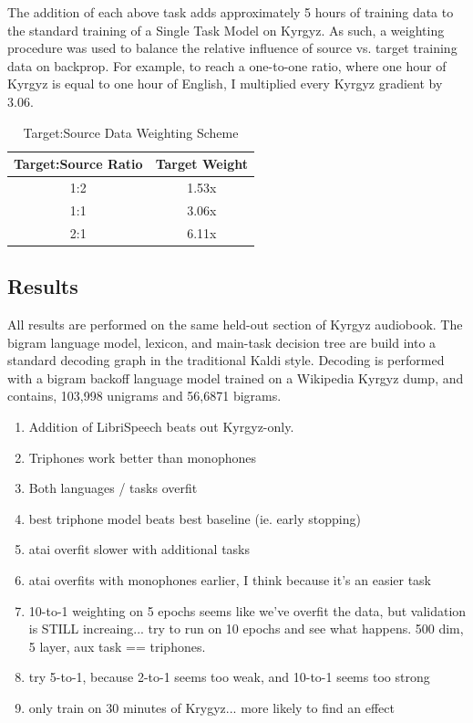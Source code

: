 \documentclass[a4paper]{article}
\begin{document}
The addition of each above task adds approximately 5 hours of training data to the standard training of a Single Task Model on Kyrgyz. As such, a weighting procedure was used to balance the relative influence of source vs. target training data on backprop. For example, to reach a one-to-one ratio, where one hour of Kyrgyz is equal to one hour of English, I multiplied every Kyrgyz gradient by $3.06$.

\begin{table}[!htbp]
  \centering
    \caption{Target:Source Data Weighting Scheme}
  \begin{adjustbox}{width=.3\textwidth}
    \begin{tabular}{cc}
      \toprule
      \textbf{Target:Source Ratio} & \textbf{Target Weight}\\
      \midrule
      1:2 & 1.53x  \\
      1:1 & 3.06x  \\
      2:1 & 6.11x  \\
      \bottomrule
    \end{tabular}
    \label{table:data}
  \end{adjustbox}
\end{table}




\subsection{Results}


All results are performed on the same held-out section of Kyrgyz audiobook. The bigram language model, lexicon, and main-task decision tree are build into a standard decoding graph in the traditional Kaldi style. Decoding is performed with a bigram backoff language model trained on a Wikipedia Kyrgyz dump, and contains, 103,998 unigrams and 56,6871 bigrams.


\begin{enumerate}
\item Addition of LibriSpeech beats out Kyrgyz-only.
\item Triphones work better than monophones
\item Both languages / tasks overfit
\item best triphone model beats best baseline (ie. early stopping)
\item atai overfit slower with additional tasks
\item atai overfits with monophones earlier, I think because it's an easier task
\item 10-to-1 weighting on 5 epochs seems like we've overfit the data, but validation is STILL increaing... try to run on 10 epochs and see what happens. 500 dim, 5 layer, aux task == triphones.
\item try 5-to-1, because 2-to-1 seems too weak, and 10-to-1 seems too strong
  \item only train on 30 minutes of Krygyz... more likely to find an effect
\end{enumerate}
\end{document}
